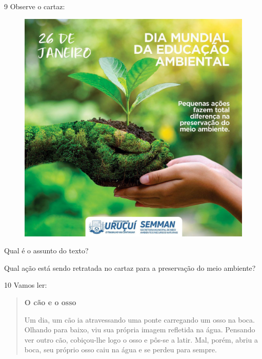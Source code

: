 \num{9} Observe o cartaz:

\begin{figure}[htpb!]
\centering
\includegraphics[width=\textwidth]{media/image123.jpeg}
\end{figure}


\begin{escolha}
\item Qual é o assunto do texto?


\item Qual ação está sendo retratada no cartaz para a preservação do meio ambiente?

\end{escolha}

\num{10} Vamos ler:

\begin{quote}
\textbf{O cão e o osso}

Um dia, um cão ia atravessando uma ponte carregando um osso na boca.
Olhando para baixo, viu sua própria imagem refletida
na água. Pensando ver outro cão, cobiçou-lhe logo o osso e
pôs-se a latir. Mal, porém, abriu a boca, seu próprio osso caiu
na água e se perdeu para sempre.

\end{quote}

